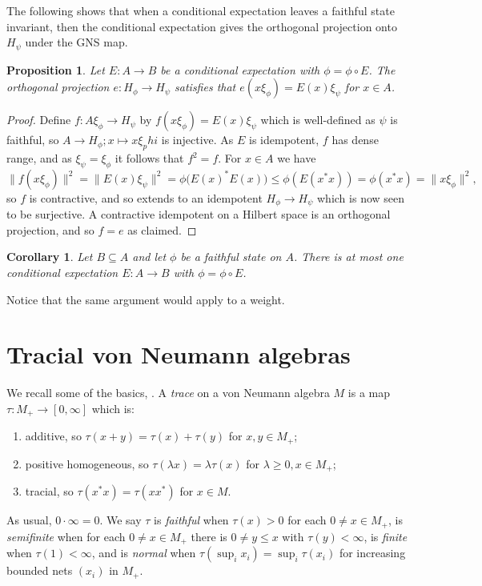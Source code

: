 \documentclass[a4paper,11pt]{article}
\newtheorem{proposition}[lemma]{Proposition}
\newtheorem{corollary}[lemma]{Corollary}
\theoremstyle{definition}
\begin{document}
The following shows that when a conditional expectation leaves a faithful state invariant, then the conditional expectation gives the orthogonal projection onto $H_\psi$ under the GNS map.

\begin{proposition}\label{prop:ce_gives_proj}
Let $E\colon A\to B$ be a conditional expectation with $\phi = \phi \circ E$.  The orthogonal projection $e \colon H_\phi \to H_\psi$ satisfies that $e(x\xi_\phi) = E(x) \xi_\psi$ for $x\in A$.
\end{proposition}
\begin{proof}
Define $f \colon A\xi_\phi \to H_\psi$ by $f(x\xi_\phi) = E(x)\xi_\psi$ which is well-defined as $\psi$ is faithful, so $A\to H_\phi; x\mapsto x\xi_phi$ is injective.  As $E$ is idempotent, $f$ has dense range, and as $\xi_\psi = \xi_\phi$ it follows that $f^2=f$.  For $x\in A$ we have
\[ \| f(x\xi_\phi) \|^2 = \| E(x)\xi_\psi \|^2 = \phi\big( E(x)^*E(x) \big)
\leq \phi(E(x^*x)) = \phi(x^*x) = \|x\xi_\phi\|^2, \]
so $f$ is contractive, and so extends to an idempotent $H_\phi \to H_\psi$ which is now seen to be surjective.  A contractive idempotent on a Hilbert space is an orthogonal projection, and so $f=e$ as claimed.
\end{proof}

\begin{corollary}
Let $B\subseteq A$ and let $\phi$ be a faithful state on $A$.  There is at most one conditional expectation $E\colon A\to B$ with $\phi = \phi\circ E$.
\end{corollary}

Notice that the same argument would apply to a weight.


\section{Tracial von Neumann algebras}

We recall some of the basics, \cite[Section~2, Chapter~V]{TakesakiI}.  A \emph{trace} on a von Neumann algebra $M$ is a map $\tau \colon M_+ \to [0,\infty]$ which is:
\begin{enumerate}
  \item additive, so $\tau(x+y) = \tau(x) + \tau(y)$ for $x,y\in M_+$;
  \item positive homogeneous, so $\tau(\lambda x) = \lambda \tau(x)$ for $\lambda\geq 0, x\in M_+$;
  \item tracial, so $\tau(x^*x) = \tau(xx^*)$ for $x\in M$.
\end{enumerate}
As usual, $0\cdot\infty = 0$.  We say $\tau$ is \emph{faithful} when $\tau(x)>0$ for each $0\not=x\in M_+$, is \emph{semifinite} when for each $0\not=x\in M_+$ there is $0\not=y\leq x$ with $\tau(y)<\infty$, is \emph{finite} when $\tau(1)<\infty$, and is \emph{normal} when $\tau(\sup_i x_i) = \sup_i \tau(x_i)$ for increasing bounded nets $(x_i)$ in $M_+$.
\end{document}
